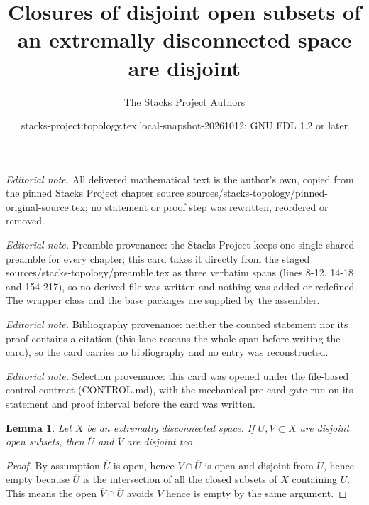 \documentclass[10pt,a4paper]{amsart}
\title{Closures of disjoint open subsets of an extremally disconnected space are disjoint}
\author{The Stacks Project Authors}
\date{stacks-project:topology.tex:local-snapshot-20261012; GNU FDL 1.2 or later}
\theoremstyle{plain}
\newtheorem{lemma}[subsection]{Lemma}
\theoremstyle{definition}
\theoremstyle{remark}
\numberwithin{equation}{subsection}
\begin{document}
\maketitle
\noindent\textit{Editorial note.} All delivered mathematical text is the author's own, copied from the pinned Stacks Project chapter source sources/stacks-topology/pinned-original-source.tex; no statement or proof step was rewritten, reordered or removed.\par\medskip
\noindent\textit{Editorial note.} Preamble provenance: the Stacks Project keeps one single shared preamble for every chapter; this card takes it directly from the staged sources/stacks-topology/preamble.tex as three verbatim spans (lines 8-12, 14-18 and 154-217), so no derived file was written and nothing was added or redefined. The wrapper class and the base packages are supplied by the assembler.\par\medskip
\noindent\textit{Editorial note.} Bibliography provenance: neither the counted statement nor its proof contains a citation (this lane rescans the whole span before writing the card), so the card carries no bibliography and no entry was reconstructed.\par\medskip
\noindent\textit{Editorial note.} Selection provenance: this card was opened under the file-based control contract (CONTROL.md), with the mechanical pre-card gate run on its statement and proof interval before the card was written.\par\medskip
\begin{lemma}
\label{lemma-intersection-empty}
Let $X$ be an extremally disconnected space.
If $U, V \subset X$ are disjoint open subsets, then
$\overline{U}$ and $\overline{V}$ are disjoint too.
\end{lemma}

\begin{proof}
By assumption $\overline{U}$ is open, hence $V \cap \overline{U}$
is open and disjoint from $U$, hence empty because $\overline{U}$
is the intersection of all the closed subsets of $X$ containing $U$.
This means the open $\overline{V} \cap \overline{U}$ avoids $V$
hence is empty by the same argument.
\end{proof}
\end{document}
